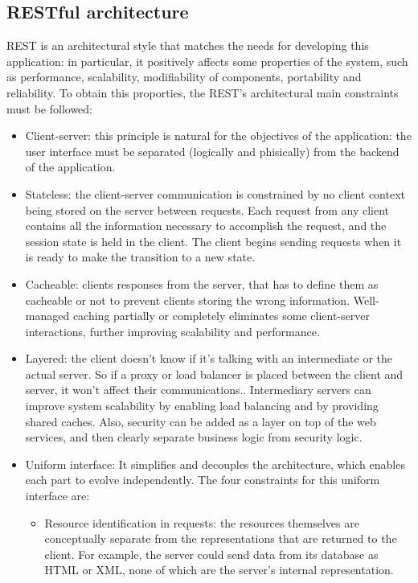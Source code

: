 \documentclass[12pt,a4paper]{report}
\begin{document}
			\subsection{RESTful architecture}
	REST is an architectural style that matches the needs for developing this application: in particular, it positively affects
some properties of the system, such as performance, scalability, modifiability of components, portability and reliability. To obtain this proporties, the REST's architectural main constraints must be followed:
\begin{itemize}
	\item{Client-server}: this principle is natural for the objectives of the application: the user interface must be separated (logically and phisically) from the backend of the application.
	\item{Stateless}: the client-server communication is constrained by no client context being stored on the server between requests. Each request from any client contains all the information necessary to accomplish the request, and the session state is held in the client. The client begins sending requests when it is ready to make the transition to a new state.
	\item{Cacheable}: clients  responses from the server, that has to define them as cacheable or not to prevent clients storing the wrong information. Well-managed caching partially or completely eliminates some client-server interactions, further improving scalability and performance.
	\item{Layered}: the client doesn't know if it's talking with an intermediate or the actual server. So if a proxy or load balancer is placed between the client and server, it won't affect their communications.. Intermediary servers can improve system scalability by enabling load balancing and by providing shared caches. Also, security can be added as a layer on top of the web services, and then clearly separate business logic from security logic.
	\item{Uniform interface}: It simplifies and decouples the architecture, which enables each part to evolve independently. The four constraints for this uniform interface are:
	\begin{itemize}
		\item{Resource identification in requests}: the resources themselves are conceptually separate from the representations that are returned to the client. For example, the server could send data from its database as HTML or XML, none of which are the server's internal representation.

\end{itemize}
\end{itemize}
\end{document}
